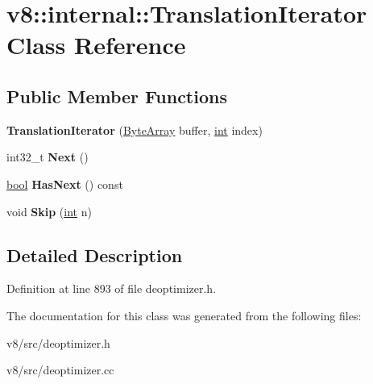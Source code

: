 \hypertarget{classv8_1_1internal_1_1TranslationIterator}{}\section{v8\+:\+:internal\+:\+:Translation\+Iterator Class Reference}
\label{classv8_1_1internal_1_1TranslationIterator}
\subsection*{Public Member Functions}
\begin{DoxyCompactItemize}
\item 
\mbox{\label{classv8_1_1internal_1_1TranslationIterator_a3309c76d999f715e1d98cc31f7032fa7}} 
{\bfseries Translation\+Iterator} (\mbox{\hyperlink{classv8_1_1internal_1_1ByteArray}{Byte\+Array}} buffer, \mbox{\hyperlink{classint}{int}} index)
\item 
\mbox{\label{classv8_1_1internal_1_1TranslationIterator_a0ff49567dd6bd8a52ded3041930bab09}} 
int32\+\_\+t {\bfseries Next} ()
\item 
\mbox{\label{classv8_1_1internal_1_1TranslationIterator_af3103c3a2d183e113df382c4cf072946}} 
\mbox{\hyperlink{classbool}{bool}} {\bfseries Has\+Next} () const
\item 
\mbox{\label{classv8_1_1internal_1_1TranslationIterator_acae567ebd888e28276f85dc636766475}} 
void {\bfseries Skip} (\mbox{\hyperlink{classint}{int}} n)
\end{DoxyCompactItemize}


\subsection{Detailed Description}


Definition at line 893 of file deoptimizer.\+h.



The documentation for this class was generated from the following files\+:\begin{DoxyCompactItemize}
\item 
v8/src/deoptimizer.\+h\item 
v8/src/deoptimizer.\+cc\end{DoxyCompactItemize}
